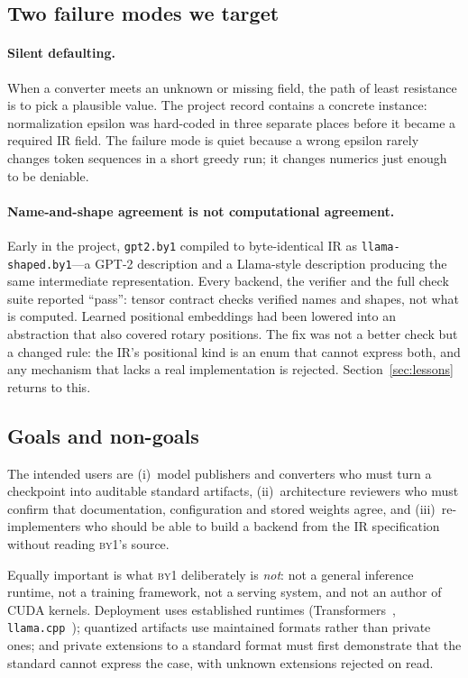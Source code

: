 \documentclass[11pt,a4paper]{article}
\newcommand{\code}[1]{\texttt{#1}}
\newcommand{\byone}{\textsc{by1}}
\newcommand{\q}[1]{\textquotedblleft #1\textquotedblright}
\begin{document}
\subsection{Two failure modes we target}

\paragraph{Silent defaulting.} When a converter meets an unknown or missing
field, the path of least resistance is to pick a plausible value. The project
record contains a concrete instance: normalization epsilon was hard-coded in
three separate places before it became a required IR field. The failure mode
is quiet because a wrong epsilon rarely changes token sequences in a short
greedy run; it changes numerics just enough to be deniable.

\paragraph{Name-and-shape agreement is not computational agreement.}
Early in the project, \code{gpt2.by1} compiled to byte-identical IR as
\code{llama-shaped.by1}---a GPT-2 description and a Llama-style description
producing the same intermediate representation. Every backend, the verifier
and the full check suite reported \q{pass}: tensor contract checks verified
names and shapes, not what is computed. Learned positional embeddings had been
lowered into an abstraction that also covered rotary positions. The fix was
not a better check but a changed rule: the IR's positional kind is an enum
that cannot express both, and any mechanism that lacks a real implementation
is rejected. Section~\ref{sec:lessons} returns to this.

\subsection{Goals and non-goals}

The intended users are (i)~model publishers and converters who must turn a
checkpoint into auditable standard artifacts, (ii)~architecture reviewers who
must confirm that documentation, configuration and stored weights agree, and
(iii)~re-implementers who should be able to build a backend from the IR
specification without reading \byone{}'s source.

Equally important is what \byone{} deliberately is \emph{not}: not a general
inference runtime, not a training framework, not a serving system, and not an
author of CUDA kernels. Deployment uses established runtimes
(Transformers~\cite{wolf2020transformers}, \code{llama.cpp}~\cite{llamacpp2023});
quantized artifacts use maintained formats rather than private ones; and
private extensions to a standard format must first demonstrate that the
standard cannot express the case, with unknown extensions rejected on read.
\end{document}
